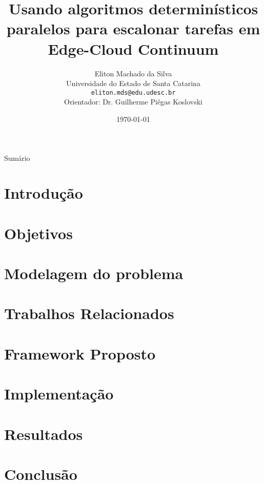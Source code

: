 \documentclass[xcolor=table]{beamer}
\title[]{Usando algoritmos determinísticos paralelos para escalonar tarefas em Edge-Cloud Continuum}
\author[Eliton Machado da Silva]{
    Eliton Machado da Silva\\\smallskip
    {\scriptsize Universidade do Estado de Santa Catarina \\\smallskip
    \vspace{-2mm}
    \texttt{eliton.mds@edu.udesc.br}\\\medskip
    {Orientador: Dr. Guilherme Piêgas Koslovski}\\
    }
}
\date{\today}
\begin{document}
    \begin{frame}
        \titlepage
    \end{frame}

    \begin{frame}[allowframebreaks]{Sumário}
        \tableofcontents
    \end{frame}

    \section[]{Introdução}
    
    

    \section[]{Objetivos}
    

    \section[]{Modelagem do problema}
    

    \section[]{Trabalhos Relacionados}

    \section[]{Framework Proposto}
    \section[]{Implementação}
    \section[]{Resultados}
    

    \section[]{Conclusão}
    

\end{document}
